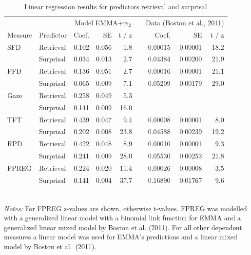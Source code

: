 \documentclass{cambridge7A}\usepackage[]{graphicx}\usepackage[]{color}
\begin{document}
\begin{subappendices}
\begin{table}
\caption{Linear regression results for predictors retrieval and surprisal} \label{lmtable}
\begin{tabular}{llrrrlrrr}
 & & \multicolumn{3}{c}{Model EMMA+rs$_2$} & & \multicolumn{3}{c}{Data (Boston et al., 2011)}  \\ \cline{3-5} \cline{7-9}
Measure & Predictor & Coef. & SE & t  / z &   & Coef. & SE & t / z \\ 
SFD & Retrieval & 0.102 & 0.056 & 1.8 &   & 0.00015 & 0.00001 & 18.2 \\ 
    & Surprisal & 0.034 & 0.013 & 2.7 &   & 0.04384 & 0.00200 & 21.9 \\ 
  FFD & Retrieval & 0.136 & 0.051 & 2.7 &   & 0.00016 & 0.00001 & 21.1 \\ 
    & Surprisal & 0.065 & 0.009 & 7.1 &   & 0.05209 & 0.00179 & 29.0 \\ 
  Gaze & Retrieval & 0.258 & 0.049 & 5.3 &   &  &  &  \\ 
    & Surprisal & 0.141 & 0.009 & 16.0 &   &  &  &  \\ 
  TFT & Retrieval & 0.439 & 0.047 & 9.4 &   & 0.00008 & 0.00001 & 8.0 \\ 
    & Surprisal & 0.202 & 0.008 & 23.8 &   & 0.04588 & 0.00239 & 19.2 \\ 
  RPD & Retrieval & 0.422 & 0.048 & 8.9 &   & 0.00010 & 0.00001 & 9.3 \\ 
    & Surprisal & 0.241 & 0.009 & 28.0 &   & 0.05530 & 0.00253 & 21.8 \\ 
  FPREG & Retrieval & 0.224 & 0.020 & 11.4 &   & 0.00026 & 0.00008 & 3.5 \\ 
    & Surprisal & 0.141 & 0.004 & 37.7 &   & 0.16890 & 0.01767 & 9.6 \\ 
\end{tabular} \\
{\footnotesize \emph{Notes:} For FPREG z-values are shown, otherwise t-values. FPREG was modelled with a generalized linear model with a binomial link function for EMMA and a generalized linear mixed model by Boston et al. (2011). For all other dependent measures a linear model was used for EMMA's predictions and a linear mixed model by Boston et al.\ (2011).}
\end{table}

\end{subappendices}
\end{document}
